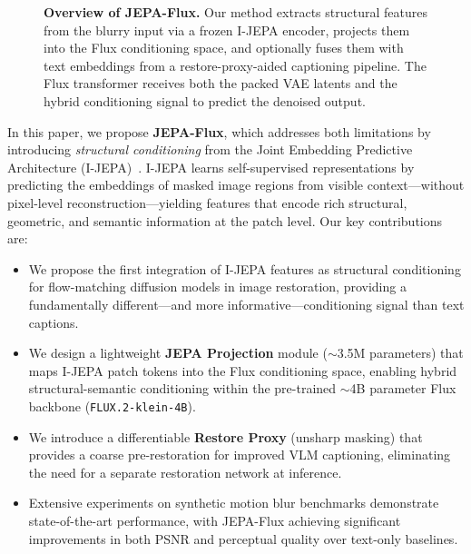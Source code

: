 \documentclass{article}
\begin{document}
\begin{figure}[t]
    \caption{\textbf{Overview of JEPA-Flux.} Our method extracts structural features from the blurry input via a frozen I-JEPA encoder, projects them into the Flux conditioning space, and optionally fuses them with text embeddings from a restore-proxy-aided captioning pipeline. The Flux transformer receives both the packed VAE latents and the hybrid conditioning signal to predict the denoised output.}
    \label{fig:overview}
\end{figure}

In this paper, we propose \textbf{JEPA-Flux}, which addresses both limitations by introducing \emph{structural conditioning} from the Joint Embedding Predictive Architecture (I-JEPA)~\cite{assran2023self}. I-JEPA learns self-supervised representations by predicting the embeddings of masked image regions from visible context---without pixel-level reconstruction---yielding features that encode rich structural, geometric, and semantic information at the patch level. Our key contributions are:

\begin{itemize}
    \item We propose the first integration of I-JEPA features as structural conditioning for flow-matching diffusion models in image restoration, providing a fundamentally different---and more informative---conditioning signal than text captions.
    \item We design a lightweight \textbf{JEPA Projection} module ($\sim$3.5M parameters) that maps I-JEPA patch tokens into the Flux conditioning space, enabling hybrid structural-semantic conditioning within the pre-trained $\sim$4B parameter Flux backbone (\texttt{FLUX.2-klein-4B}).
    \item We introduce a differentiable \textbf{Restore Proxy} (unsharp masking) that provides a coarse pre-restoration for improved VLM captioning, eliminating the need for a separate restoration network at inference.
    \item Extensive experiments on synthetic motion blur benchmarks demonstrate state-of-the-art performance, with JEPA-Flux achieving significant improvements in both PSNR and perceptual quality over text-only baselines.
\end{itemize}
\end{document}
